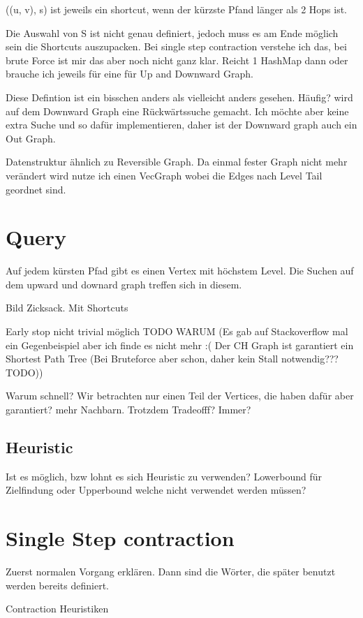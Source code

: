((u, v), s) ist jeweils ein shortcut, wenn der kürzste Pfand länger als 2 Hops ist.

Die Auswahl von S ist nicht genau definiert, jedoch muss es am Ende möglich sein die Shortcuts auszupacken.
Bei single step contraction verstehe ich das, bei brute Force ist mir das aber noch nicht ganz klar. Reicht 1 HashMap dann oder brauche ich jeweils für eine für Up and Downward Graph.


Diese Defintion ist ein bisschen anders als vielleicht anders gesehen. Häufig? wird auf dem Downward Graph eine Rückwärtssuche gemacht. Ich möchte aber keine extra Suche und so dafür implementieren, daher ist der Downward graph auch ein Out Graph.

Datenstruktur ähnlich zu Reversible Graph. Da einmal fester Graph nicht mehr verändert wird nutze ich einen VecGraph wobei die Edges nach Level Tail geordnet sind.

\section{Query}
Auf jedem kürsten Pfad gibt es einen Vertex mit höchstem Level. Die Suchen auf dem upward und downard graph treffen sich in diesem.

Bild Zicksack. Mit Shortcuts

Early stop nicht trivial möglich TODO WARUM (Es gab auf Stackoverflow mal ein Gegenbeispiel aber ich finde es nicht mehr :( Der CH Graph ist garantiert ein Shortest Path Tree (Bei Bruteforce aber schon, daher kein Stall notwendig??? TODO))

Warum schnell? Wir betrachten nur einen Teil der Vertices, die haben dafür aber garantiert? mehr Nachbarn. Trotzdem Tradeofff? Immer?

\subsection{Heuristic}

Ist es möglich, bzw lohnt es sich Heuristic zu verwenden? Lowerbound für Zielfindung oder Upperbound welche nicht verwendet werden müssen?


\section{Single Step contraction}
Zuerst normalen Vorgang erklären. Dann sind die Wörter, die später benutzt werden bereits definiert.

Contraction Heuristiken

